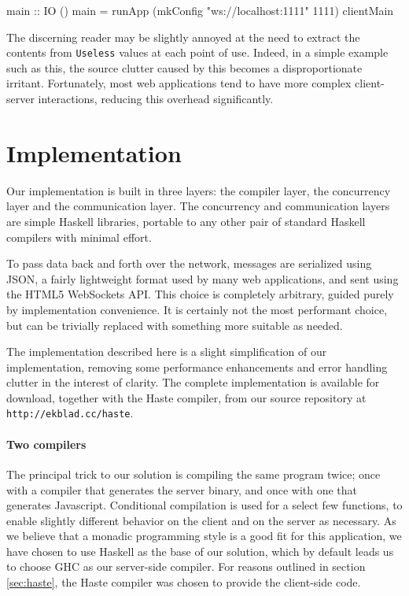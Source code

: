 \documentclass[preprint]{sigplanconf}
\begin{document}
\begin{code}
main :: IO ()
main =
  runApp (mkConfig "ws://localhost:1111" 1111)
         clientMain
\end{code}

The discerning reader may be slightly annoyed at the need to extract the
contents from \lstinline!Useless! values at each point of use. Indeed, in a
simple example such as this, the source clutter caused by this becomes a
disproportionate irritant. Fortunately, most web applications tend to have
more complex client-server interactions, reducing this overhead significantly.

\section{Implementation}\label{sec:impl}

Our implementation is built in three layers: the compiler layer, the
concurrency layer and the communication layer. The concurrency and
communication layers are simple Haskell libraries, portable to any other pair
of standard Haskell compilers with minimal effort.

To pass data back and forth over the network, messages are serialized using
JSON, a fairly lightweight format used by many web applications, and sent using
the HTML5 WebSockets API. This choice is completely arbitrary, guided purely
by implementation convenience. It is certainly not the most performant choice,
but can be trivially replaced with something more suitable as needed.

The implementation described here is a slight simplification of our
implementation, removing some performance enhancements and error handling
clutter in the interest of clarity. The complete implementation is available
for download, together with the Haste compiler, from our source repository at
\lstinline!http://ekblad.cc/haste!.


\paragraph{Two compilers}
The principal trick to our solution is compiling the same program twice; once
with a compiler that generates the server binary, and once with one that
generates Javascript. Conditional compilation is used for a select few
functions, to enable slightly different behavior on the client and on the
server as necessary. As we believe that a monadic programming style is a good
fit for this application, we have chosen to use Haskell as the base of our
solution, which by default leads us to choose GHC as our server-side compiler.
For reasons outlined in section \ref{sec:haste}, the Haste compiler was chosen
to provide the client-side code.
\end{document}
